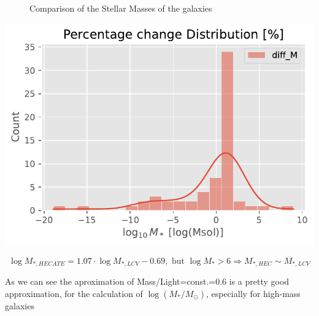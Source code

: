 \documentclass[
]{article}
\begin{document}
\begin{figure}


\caption{\label{fig-mass-compare}Comparison of the Stellar Masses of the
galaxies}

\end{figure}%

\includegraphics{compare_files/figure-pdf/cell-44-output-1.pdf}

\[
\log{M_{*,HECATE}}=1.07\cdot\log{M_{*,LCV}}-0.69, \text{ but } \log{M_*}>6\Rightarrow M_{*,HEC}\sim M_{*,LCV}
\]

As we can see the aproximation of Mass/Light=const.=0.6 is a pretty good
approximation, for the calculation of \(\log(M_*/M_\odot)\), especially
for high-mass galaxies
\end{document}
